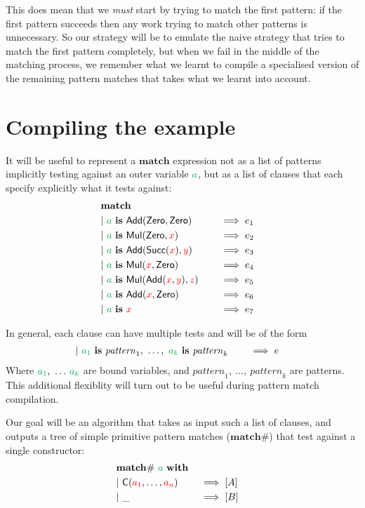 \documentclass[a4paper, 11pt]{article}
\theoremstyle{definition}
\begin{document}
This does mean that we \emph{must} start by trying to match the first pattern: if the first pattern succeeds then any work trying to match other patterns is unnecessary. So our strategy will be to emulate the naive strategy that tries to match the first pattern completely, but when we fail in the middle of the matching process, we remember what we learnt to compile a specialised version of the remaining pattern matches that takes what we learnt into account.

\section{Compiling the example}

\newcommand{\is}{\mathbf{\ is\ }}

It will be useful to represent a $\mathbf{match}$ expression not as a list of patterns implicitly testing against an outer variable $\ba$, but as a list of clauses that each specify explicitly what it tests against:
\begin{alignat*}{4}
\matchclauses \\
\clause{\ba \is \Add(\Zero, \Zero)}{e_1} \\
\clause{\ba \is \Mul(\Zero, \fvar{x})}{e_2} \\
\clause{\ba \is \Add(\Succ(\fvar x), \fvar y)}{e_3} \\
\clause{\ba \is \Mul(\fvar x, \Zero)}{e_4} \\
\clause{\ba \is \Mul(\Add(\fvar x, \fvar y), \fvar z)}{e_5} \\
\clause{\ba \is \Add(\fvar x, \Zero)}{e_6} \\
\clause{\ba \is \fvar x}{e_7} \\
\end{alignat*}

\newcommand{\patt}{\mathit{pattern}}
In general, each clause can have multiple tests and will be of the form
\begin{alignat*}{4}
  \clause{\bvar{a_1} \is \patt_1,\ \dots,\ \bvar{a_k} \is \patt_k}{e}
\end{alignat*}
Where $\bvar{a_1},\ \dots\, \bvar{a_k}$ are bound variables, and $\patt_1,\ \dots,\ \patt_k$ are patterns.
This additional flexiblity will turn out to be useful during pattern match compilation.

Our goal will be an algorithm that takes as input such a list of clauses, and outputs a tree of simple primitive pattern matches ($\mathbf{match\#}$) that test against a single constructor:
\begin{alignat*}{4}
  \matchwithZ{\ba} \\
  \clause{\C(\fvar{a_1}, \dots, \fvar{a_n})}{[A]} \\
  \clause{\_}{[B]}
\end{alignat*}
\end{document}
